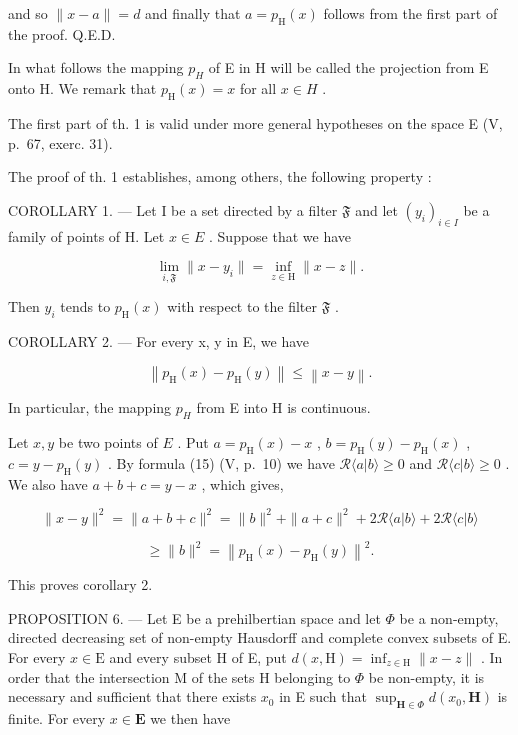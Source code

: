 and so \(\| x - a\| = d\) and finally that \(a = p_{\mathrm{H}}(x)\) follows from the first part of the proof. Q.E.D.

In what follows the mapping \(p_{H}\) of E in H will be called the projection from E onto H. We remark that \(p_{\mathrm{H}}(x)=x\) for all \(x\in H\) .

The first part of th. 1 is valid under more general hypotheses on the space E (V, p.~67, exerc. 31).

The proof of th. 1 establishes, among others, the following property :

COROLLARY 1. --- Let I be a set directed by a filter \(\mathfrak{F}\) and let \((y_i)_{i\in I}\) be a family of points of H. Let \(x\in E\) . Suppose that we have

\[
\lim _ {i, \mathfrak {F}} \| x - y _ {i} \| = \inf _ {z \in \mathrm{H}} \| x - z \|.
\]

Then \(y_{i}\) tends to \(p_{\mathrm{H}}(x)\) with respect to the filter \(\mathfrak{F}\) .

COROLLARY 2. --- For every x, y in E, we have

\[
\left\| p _ {\mathrm{H}} (x) - p _ {\mathrm{H}} (y) \right\| \leqslant \left\| x - y \right\|.
\]

In particular, the mapping \(p_{H}\) from E into H is continuous.

Let \(x, y\) be two points of \(E\) . Put \(a = p_{\mathrm{H}}(x) - x\) , \(b = p_{\mathrm{H}}(y) - p_{\mathrm{H}}(x)\) , \(c = y - p_{\mathrm{H}}(y)\) . By formula (15) (V, p.~10) we have \(\mathcal{R}\langle a|b\rangle \geqslant 0\) and \(\mathcal{R}\langle c|b\rangle \geqslant 0\) . We also have \(a + b + c = y - x\) , which gives,

\[
\| x - y \| ^ {2} = \| a + b + c \| ^ {2} = \| b \| ^ {2} + \| a + c \| ^ {2} + 2 \mathscr {R} \langle a | b \rangle + 2 \mathscr {R} \langle c | b \rangle
\]

\[
\geqslant \| b \| ^ {2} = \left\| p _ {\mathrm{H}} (x) - p _ {\mathrm{H}} (y) \right\| ^ {2}.
\]

This proves corollary 2.

PROPOSITION 6. --- Let E be a prehilbertian space and let \(\Phi\) be a non-empty, directed decreasing set of non-empty Hausdorff and complete convex subsets of E. For every \(x \in \mathrm{E}\) and every subset H of E, put \(d(x, \mathrm{H}) = \inf_{z \in \mathrm{H}} \| x - z \|\) . In order that the intersection M of the sets H belonging to \(\Phi\) be non-empty, it is necessary and sufficient that there exists \(x_0\) in E such that \(\sup_{\mathbf{H} \in \Phi} d(x_0, \mathbf{H})\) is finite. For every \(x \in \mathbf{E}\) we then have

